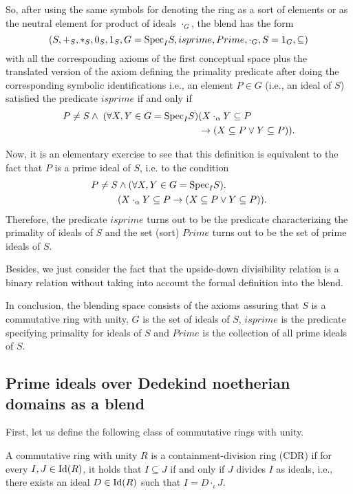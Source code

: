 So, after using the same symbols for denoting the ring as a sort of
elements or as the neutral element for product of ideals $\cdot_G$,
the blend has the form
%
\[(S, +_S, *_S, 0_S, 1_S, G={\rm Spec}_IS, isprime, Prime, \cdot_G, S=1_G, \subseteq)\]
with all the corresponding axioms of the first conceptual space plus the translated version of the axiom defining the primality predicate after doing the corresponding symbolic identifications i.e., an element $P \in G$ (i.e., an ideal of $S$) satisfied the predicate $isprime$ if and only if 
\begin{align*}
  P\neq S \wedge\; (\forall X,Y\in G={\rm Spec}_IS) & (X\cdot_{\alpha}Y\subseteq P \\
                  & \rightarrow (X\subseteq P \vee Y\subseteq P)).
\end{align*}

Now, it is an elementary exercise to see that this definition is equivalent to the fact that $P$ is a prime ideal of $S$, i.e. to the condition
\begin{align*}
P\neq S & \wedge (\forall X,Y\in G={\rm Spec}_IS). \\
        & (X\cdot_{\alpha}Y\subseteq P \rightarrow (X\subseteq P \vee Y\subseteq P)).
\end{align*}
Therefore, the predicate $isprime$ turns out to be the predicate characterizing the primality of ideals of $S$ and the set (sort) $Prime$ turns out to be the set of prime ideals of $S$.

Besides, we just consider the fact that the upside-down divisibility
relation is a binary relation without taking into account the formal
definition into the blend.


In conclusion, the blending space consists of the axioms assuring that $S$ is a commutative ring with unity, $G$ is the set of ideals of $S$, $isprime$ is the predicate specifying primality for ideals of $S$ and $Prime$ is the collection of all prime ideals of $S$. 

\subsection{Prime ideals over Dedekind noetherian domains as a blend}

First, let us define the following class of commutative rings with unity.

\begin{definition}
A commutative ring with unity $R$ is a containment-division ring (CDR) if for every $I,J \in {\rm Id}(R)$, it holds that $I \subseteq J$ if and only if $J$ divides $I$ as ideals, i.e., there exists an ideal $D \in {\rm Id}(R)$ such that $I=D\cdot_{\iota}J$.
\end{definition}

